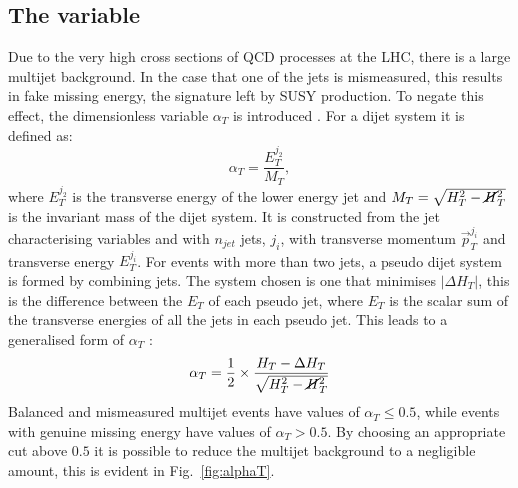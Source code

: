 
\subsection{The \alphat variable}

Due to the very high cross sections of QCD processes at the LHC, there
is a large multijet background. In the case that one of the jets is
mismeasured, this results in fake missing energy, the signature left
by SUSY production. To negate this effect, the dimensionless variable
$\alpha_T$ is introduced
\cite{AlphaTproposalCMS:2008vya,AlphaTproposalPhysRevLett.101.221803}.
For a dijet system it is defined as: 
\begin{equation}
\alpha_T=\frac{E_T^{j_2}}{M_T}, \end{equation} 
where $E_T^{j_2}$ is
the transverse energy of the lower energy jet and
$M_T=\sqrt{H_T^2-\cancel{H}_T^2}$ is the invariant mass of the dijet
system. It is constructed from the jet characterising variables \HT
and \MHT
with $n_{jet}$ jets, $j_i$, with transverse momentum
$\vec{p}_T^{j_i}$ and transverse energy $E_T^{j_i}$. For events with
more than two jets, a pseudo dijet system is formed by combining jets.
The system chosen is one that minimises $|\Delta H_T|$, this is the
difference between the $E_T$ of each pseudo jet, where $E_T$ is the
scalar sum of the transverse energies of all the jets in each pseudo
jet. This leads to a generalised form of $\alpha_T$
\cite{AlphaT8TeVChatrchyan:2013lya}: 
\begin{equation}
\alpha_T=\frac{1}{2}\times\frac{H_T-\Delta
H_T}{\sqrt{H_T^2-\cancel{H}_T^2}} \end{equation} 
Balanced and
mismeasured multijet events have values of $\alpha_T\leq0.5$, while
events with genuine missing energy have values of $\alpha_T>0.5$. By
choosing an appropriate cut above $0.5$ it is possible to reduce the
multijet background to a negligible amount, this is evident in
Fig.~\ref{fig:alphaT}. 


